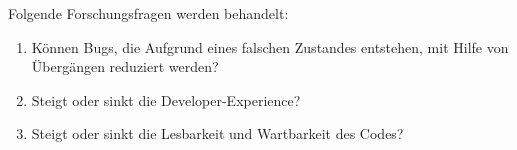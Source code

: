 Folgende Forschungsfragen werden behandelt:

\begin{enumerate}
  \item Können Bugs, die Aufgrund eines falschen Zustandes entstehen, mit Hilfe von  Übergängen reduziert werden?
  \item Steigt oder sinkt die Developer-Experience?
  \item Steigt oder sinkt die Lesbarkeit und Wartbarkeit des Codes?
\end{enumerate}
